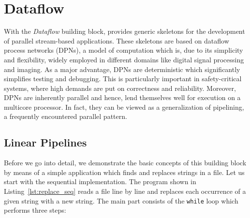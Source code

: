 \chapter{Dataflow}
\label{cha:dataflow}

With the \emph{Dataflow} building block, \embb provides generic skeletons for the development of parallel stream-based applications. These skeletons are based on dataflow process networks (DPNs), a model of computation which is, due to its simplicity and flexibility, widely employed in different domains like digital signal processing and imaging. As a major advantage, DPNs are deterministic which significantly simplifies testing and debugging. This is particularly important in safety-critical systems, where high demands are put on correctness and reliability. Moreover, DPNs are inherently parallel and hence, lend themselves well for execution on a multicore processor. In fact, they can be viewed as a generalization of pipelining, a frequently encountered parallel pattern.


\section{Linear Pipelines}

Before we go into detail, we demonstrate the basic concepts of this building block by means of a simple application which finds and replaces strings in a file. Let us start with the sequential implementation. The program shown in Listing~\ref{lst:replace_seq} reads a file line by line and replaces each occurrence of a given string with a new string. The main part consists of the \lstinline|while| loop which performs three steps:

